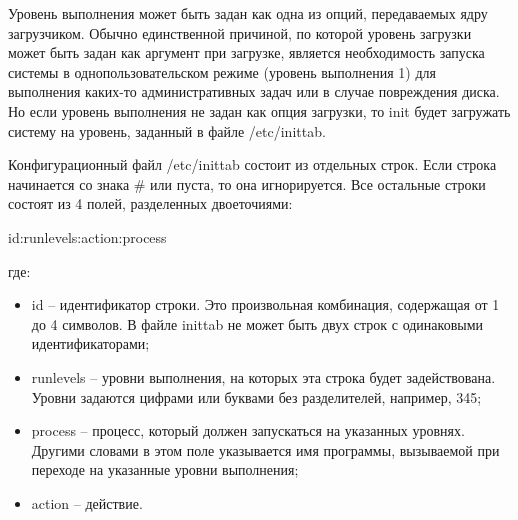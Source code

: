 Уровень выполнения может быть задан как одна из опций, передаваемых ядру загрузчиком. Обычно единственной причиной, по которой уровень загрузки может быть задан как аргумент при загрузке, является необходимость запуска системы в однопользовательском режиме (уровень выполнения 1) для выполнения каких-то административных задач или в случае повреждения диска. Но если уровень выполнения не задан как опция загрузки, то init будет загружать систему на уровень, заданный в файле /etc/inittab.

Конфигурационный файл /etc/inittab состоит из отдельных строк. Если строка начинается со знака \# или пуста, то она игнорируется. Все остальные строки состоят из 4 полей, разделенных двоеточиями:

id:runlevels:action:process

где:
\begin{itemize}
\item id -- идентификатор строки. Это произвольная комбинация, содержащая от 1 до 4 символов. В файле inittab не может быть двух строк с одинаковыми идентификаторами;
\item runlevels -- уровни выполнения, на которых эта строка будет задействована. Уровни задаются цифрами или буквами без разделителей, например, 345;
\item process -- процесс, который должен запускаться на указанных уровнях. Другими словами в этом поле указывается имя программы, вызываемой при переходе на указанные уровни выполнения;
\item action -- действие.
\end{itemize}


